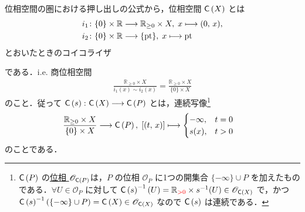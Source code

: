 \documentclass[TQFT_main]{subfiles}
\begin{document}
位相空間の圏における押し出しの公式から，位相空間 $\mathsf{C}\left( X \right)$ とは
\begin{align}
    i_1 \colon \{0\} \times \mathbb{R} &\longrightarrow \mathbb{R}_{\ge 0} \times X,\; x \longmapsto (0,\, x), \\
    i_2 \colon \{0\} \times \mathbb{R} &\longrightarrow \{\mathrm{pt}\},\; x \longmapsto \mathrm{pt}
\end{align}
とおいたときのコイコライザ
\begin{center}
\end{center}
である．i.e. 商位相空間
\begin{align}
    \frac{\mathbb{R}_{\ge 0} \times X}{i_1 (x) \sim i_2 (x)} = \frac{\mathbb{R}_{\ge 0} \times X}{\{0\} \times X}
\end{align}
のこと．従って $\mathsf{C}\left( s \right) \colon \mathsf{C}\left( X \right) \longrightarrow \mathsf{C}\left( P \right)$ とは，連続写像\footnote{$\mathsf{C}\left( P \right)$ の\hyperref[def:topo-poset]{位相 $\mathscr{O}_{\mathsf{C}\left( P \right)}$}は，$P$ の位相 $\mathscr{O}_{P}$ に1つの開集合 $\{-\infty\} \cup P$ を加えたものである．$\forall U \in \mathscr{O}_{P}$ に対して $\mathsf{C}\left( s \right)^{-1} (U) = \mathbb{R}_{\textcolor{red}{>0}} \times s^{-1}(U) \in \mathscr{O}_{\mathsf{C}\left( X \right)}$ で，かつ $\mathsf{C}\left( s \right)^{-1}(\{-\infty\} \cup P) = \mathsf{C}\left( X \right) \in \mathscr{O}_{\mathsf{C}\left( X \right)}$ なので $\mathsf{C}\left( s \right)$ は連続である．}
\begin{align}
    \frac{\mathbb{R}_{\ge 0} \times X}{\{0\} \times X} &\longrightarrow \mathsf{C}\left( P \right),\;
    [(t,\, x)] \longmapsto \begin{cases}
        -\infty, &t = 0 \\
        s(x), &t > 0
    \end{cases}
\end{align}
のことである．
\end{document}
